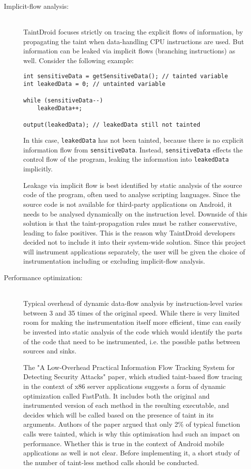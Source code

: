 \documentclass[12pt]{article}
\begin{document}
\begin{description}
\item [Implicit-flow analysis:] \ \\
TaintDroid focuses strictly on tracing the explicit flows of information, 
by propagating the taint when data-handling CPU instructions are used. 
But information can be leaked via implicit flows (branching instructions) 
as well. Consider the following example:

\begin{verbatim}
int sensitiveData = getSensitiveData(); // tainted variable
int leakedData = 0; // untainted variable

while (sensitiveData--)
    leakedData++;

output(leakedData); // leakedData still not tainted
\end{verbatim}

In this case, \verb|leakedData| has not been tainted, because there is 
no explicit information flow from \verb|sensitiveData|. Instead, 
\verb|sensitiveData| effects the control flow of the program, leaking
the information into \verb|leakedData| implicitly. 

Leakage via implicit flow is best identified by static analysis of the 
source code of the program, often used to analyse scripting languages. 
Since the source code is not available for third-party applications on 
Android, it needs to be analysed dynamically on the instruction level.
Downside of this solution is that the taint-propagation rules must be
rather conservative, leading to false positives. This is the reason why
TaintDroid developers decided not to include it into their system-wide
solution. Since this project will instrument applications separately, 
the user will be given the choice of instrumentation including or 
excluding implicit-flow analysis.

\item [Performance optimization:] \ \\
Typical overhead of dynamic data-flow analysis by instruction-level 
varies between 3 and 35 times of the original speed. While there is
very limited room for making the instrumentation itself more efficient,
time can easily be invested into static analysis of the code which would
identify the parts of the code that need to be instrumented, i.e. the 
possible paths between sources and sinks. 

The "A Low-Overhead Practical Information Flow Tracking System for 
Detecting Security Attacks" paper, which studied taint-based flow tracing 
in the context of x86 server applications suggests a form of dynamic 
optimization called FastPath. It includes both the original and 
instrumented version of each method in the resulting executable, and
decides which will be called based on the presence of taint in its 
arguments. Authors of the paper argued that only 2\% of typical function
calls were tainted, which is why this optimisation had such an impact
on performance. Whether this is true in the context of Android mobile
applications as well is not clear. Before implementing it, a short study
of the number of taint-less method calls should be conducted.


\end{description}
\end{document}
